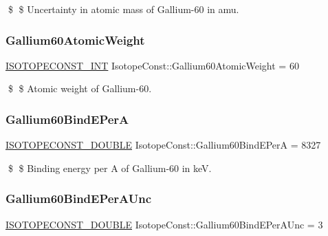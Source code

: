 \$ \$ Uncertainty in atomic mass of Gallium-\/60 in amu. \mbox{\label{group___isotope_const-_gallium-_ga60_ga33897cc7594541c17576898c5fff0ec6}} 
\subsubsection{\texorpdfstring{Gallium60\+Atomic\+Weight}{Gallium60AtomicWeight}}
{\footnotesize\ttfamily \mbox{\hyperlink{group___isotope_const-_macros_ga5f18360b3e99483a35c32d789e62621c}{I\+S\+O\+T\+O\+P\+E\+C\+O\+N\+S\+T\+\_\+\+I\+NT}} Isotope\+Const\+::\+Gallium60\+Atomic\+Weight = 60}

\$ \$ Atomic weight of Gallium-\/60. \mbox{\label{group___isotope_const-_gallium-_ga60_gaa6f546a0f1fcacd6d6fac4eccce4e3ea}} 
\subsubsection{\texorpdfstring{Gallium60\+Bind\+E\+PerA}{Gallium60BindEPerA}}
{\footnotesize\ttfamily \mbox{\hyperlink{group___isotope_const-_macros_ga8f45a7272ce02c0b4c65c44636ed719a}{I\+S\+O\+T\+O\+P\+E\+C\+O\+N\+S\+T\+\_\+\+D\+O\+U\+B\+LE}} Isotope\+Const\+::\+Gallium60\+Bind\+E\+PerA = 8327}

\$ \$ Binding energy per A of Gallium-\/60 in keV. \mbox{\label{group___isotope_const-_gallium-_ga60_ga0f3b4d2adeadfbc26764997d15cfe8e9}} 
\subsubsection{\texorpdfstring{Gallium60\+Bind\+E\+Per\+A\+Unc}{Gallium60BindEPerAUnc}}
{\footnotesize\ttfamily \mbox{\hyperlink{group___isotope_const-_macros_ga8f45a7272ce02c0b4c65c44636ed719a}{I\+S\+O\+T\+O\+P\+E\+C\+O\+N\+S\+T\+\_\+\+D\+O\+U\+B\+LE}} Isotope\+Const\+::\+Gallium60\+Bind\+E\+Per\+A\+Unc = 3}

